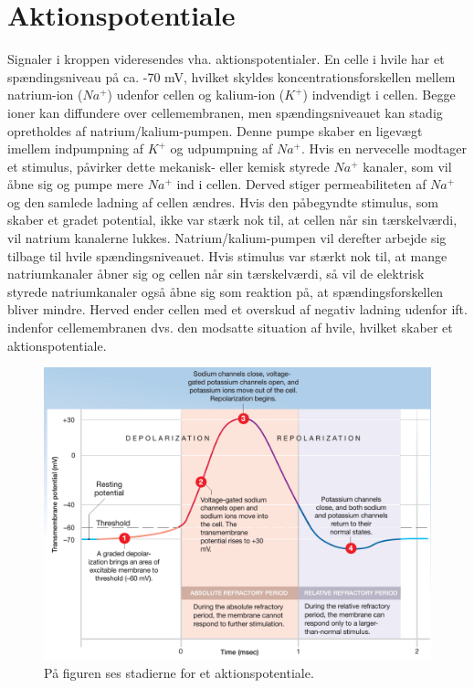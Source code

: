\section{Aktionspotentiale}
Signaler i kroppen videresendes vha. aktionspotentialer. En celle i hvile har et spændingsniveau på ca. -70 mV, hvilket skyldes koncentrationsforskellen mellem natrium-ion ($Na^{+}$) udenfor cellen og kalium-ion ($K^{+}$) indvendigt i cellen. Begge ioner kan diffundere over cellemembranen, men spændingsniveauet kan stadig opretholdes af natrium/kalium-pumpen. Denne pumpe skaber en ligevægt imellem indpumpning af $K^{+}$ og udpumpning af $Na^{+}$. Hvis en nervecelle modtager et stimulus, påvirker dette mekanisk- eller kemisk styrede $Na^{+}$ kanaler, som vil åbne sig og pumpe mere $Na^{+}$ ind i cellen. Derved stiger permeabiliteten af $Na^{+}$ og den samlede ladning af cellen ændres. Hvis den påbegyndte stimulus, som skaber et gradet potential, ikke var stærk nok til, at cellen når sin tærskelværdi, vil natrium kanalerne lukkes. Natrium/kalium-pumpen vil derefter arbejde sig tilbage til hvile spændingsniveauet. Hvis stimulus var stærkt nok til, at mange natriumkanaler åbner sig og cellen når sin tærskelværdi, så vil de elektrisk styrede natriumkanaler også åbne sig som reaktion på, at spændingsforskellen bliver mindre. Herved ender cellen med et overskud af negativ ladning udenfor ift. indenfor cellemembranen dvs. den modsatte situation af hvile, hvilket skaber et aktionspotentiale. \cite{Martini2012,Stanfield2014}

\begin{figure}[H]
	\centering
	\includegraphics[scale=0.45]{figures/bProblemanalyse/Aktion2.png}
	\caption{På figuren ses stadierne for et aktionspotentiale. \cite{Martini2012}}
	\label{nervemuskel}
\end{figure}

